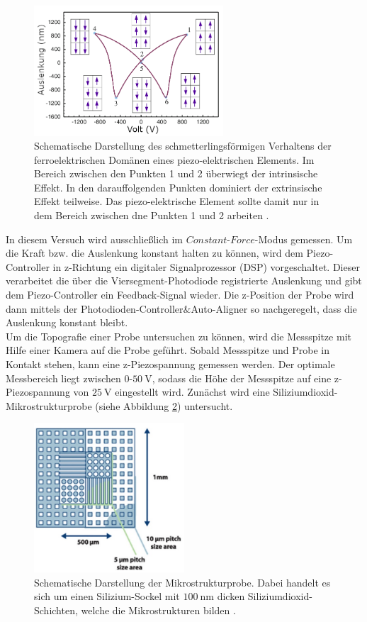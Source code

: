 \begin{figure}[H]
	\centering
	\includegraphics[width=0.63\textwidth]{Abb/butterfly.png}
	\caption{Schematische Darstellung des schmetterlingsförmigen Verhaltens der
	ferroelektrischen Domänen eines piezo-elektrischen Elements. Im Bereich zwischen
	den Punkten 1 und 2 überwiegt	der intrinsische Effekt. In den darauffolgenden
	Punkten dominiert der extrinsische Effekt teilweise. Das piezo-elektrische
	Element sollte damit nur in dem Bereich zwischen dne Punkten 1 und 2 arbeiten
	\cite[47]{AFM}.}
	\label{fig:butterfly}
\end{figure}

\noindent
In diesem Versuch wird ausschließlich im $\textit{Constant-Force}$-Modus gemessen.
Um die Kraft bzw. die Auslenkung konstant halten zu können, wird dem Piezo-Controller
in z-Richtung ein digitaler Signalprozessor (DSP) vorgeschaltet. Dieser verarbeitet
die über die Viersegment-Photodiode registrierte Auslenkung und gibt dem Piezo-Controller
ein Feedback-Signal wieder. Die z-Position der Probe wird dann mittels der
Photodioden-Controller$\&$Auto-Aligner so nachgeregelt, dass die Auslenkung
konstant bleibt.\\
Um die Topografie einer Probe untersuchen zu können, wird die Messspitze mit Hilfe
einer Kamera auf die Probe geführt. Sobald Messspitze und Probe in Kontakt stehen,
kann eine z-Piezospannung gemessen werden. Der optimale Messbereich liegt
zwischen 0-$\SI{50}{\volt}$, sodass die Höhe der Messspitze auf eine
z-Piezospannung von $\SI{25}{\volt}$ eingestellt wird. Zunächst wird eine
Siliziumdioxid-Mikrostrukturprobe (siehe Abbildung \ref{fig:MSP}) untersucht.

\begin{figure}[H]
	\centering
	\includegraphics[width=0.5\textwidth]{Abb/MSP.png}
	\caption{Schematische Darstellung der Mikrostrukturprobe. Dabei handelt es sich
	um einen Silizium-Sockel mit $\SI{100}{\nano\meter}$ dicken Siliziumdioxid-Schichten,
	welche die Mikrostrukturen bilden	\cite[4]{anleitung}.}
	\label{fig:MSP}
\end{figure}

